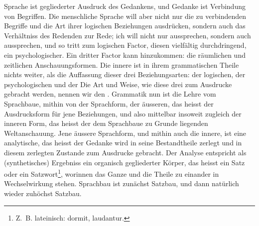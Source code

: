 Sprache ist gegliederter Ausdruck des Gedankens, und Gedanke ist Verbindung von Begriffen. Die menschliche Sprache will aber nicht nur die zu verbindenden Begriffe und die Art ihrer logischen Beziehungen ausdrücken, sondern auch das Verhältniss des Redenden zur Rede; ich will nicht nur  aussprechen, sondern auch  aussprechen, und so tritt zum logischen Factor, diesen vielfältig durchdringend, ein psychologischer. Ein dritter Factor kann hinzukommen: die räumlichen und zeitlichen Anschauungsformen. Die innere  ist in ihrem grammatischen Theile nichts weiter, als die Auffassung dieser drei Beziehungsarten: der logischen, der psychologischen und der  Die Art und Weise, wie diese drei zum Ausdrucke gebracht werden, nennen wir den . Grammatik nun ist die Lehre vom Sprachbaue, mithin von der Sprachform, der äusseren, das heisst der Ausdrucksform für jene Beziehungen, und also mittelbar insoweit zugleich der inneren Form, das heisst der dem Sprachbaue zu Grunde liegenden Weltanschauung. Jene äussere Sprachform, und mithin auch die innere, ist eine analytische, das heisst der Gedanke wird in seine \label{fp.83} Bestandtheile zerlegt und in diesem zerlegten Zustande zum Ausdrucke gebracht. Der Analyse entspricht als (synthetisches) Ergebniss ein organisch gegliederter Körper, das heisst ein Satz oder ein Satzwort\footnote{Z.~B. lateinisch: dormit, laudantur.}, worinnen das Ganze und die Theile zu einander in Wechselwirkung stehen. Sprachbau ist zunächst Satzbau, und dann natürlich wieder zuhöchst Satzbau.

